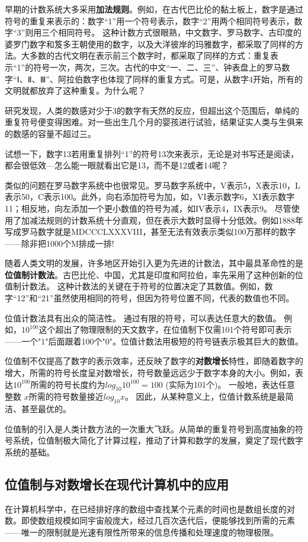 早期的计数系统大多采用{\bf 加法规则}。例如，在古代巴比伦的黏土板上，数字是通过符号的重复来表示的：数字“1”用一个符号表示，数字“2”用两个相同符号表示，数字“3”则用三个相同符号。
这种计数方式很眼熟，中文数字、罗马数字、古印度的婆罗门数字和笈多王朝使用的数字，以及大洋彼岸的玛雅数字，都采取了同样的方法。大多数的古代文明在表示前三个数字时，都采取了同样的方式：重复表示“1”的符号一次，两次，三次。古代的中文“一、二、三”、钟表盘上的罗马数字“Ⅰ、Ⅱ、Ⅲ”、阿拉伯数字也体现了同样的重复方式。可是，从数字4开始，所有的文明就都放弃了这种重复。为什么呢？

研究发现，人类的数感对少于3的数字有天然的反应，但超出这个范围后，单纯的重复符号便变得困难。对一些出生几个月的婴孩进行试验，结果证实人类与生俱来的数感的容量不超过三。

试想一下，数字13若用重复排列“1”的符号13次来表示，无论是对书写还是阅读，都会很低效---怎么能一眼就看出它是13，而不是12或者14呢？

类似的问题在罗马数字系统中也很常见。罗马数字系统中，V表示5，X表示10，L表示50，C表示100。此外，向右添加符号为加，如，VI表示数字6，XI表示数字11；相反地，向左添加一个更小数值的符号为减，如IV表示4，IX表示9。
尽管使用了加减法规则的计数系统十分直观，但在表示大数时显得十分低效。例如1888年写成罗马数字就是MDCCCLXXXVIII，甚至无法有效表示类似100万那样的数字——除非把1000个M排成一排!

随着人类文明的发展，许多地区开始引入更为先进的计数法，其中最具革命性的是{\bf 位值制计数法}。古巴比伦、中国，尤其是印度和阿拉伯，率先采用了这种创新的位值制计数法。
这种计数法的关键在于符号的位置决定了其数值。例如，数字“12”和“21”虽然使用相同的符号，但因为符号位置不同，代表的数值也不同。

位值计数法具有出众的简洁性。
通过有限的符号，可以表达任意大的数值。
例如，$10^{100}$这个超出了物理限制的天文数字，在位值制下仅需101个符号即可表示——一个"1"后面跟着100个"0"。位值计数法用极短的符号链表示极其巨大的数值。

位值制不仅提高了数字的表示效率，还反映了数字的{\bf 对数增长}特性，即随着数字的增大，所需的符号长度呈对数增长，符号数量远远少于数字本身的大小。例如，表达$10^{100}$所需的符号长度约为$log_10 10^{100}=100$ (实际为101个)。
一般地，表达任意整数 $x$所需的符号数量接近$log_{10} x$。
因此，从某种意义上，位值计数系统是最简洁、甚至最优的。

位值制的引入是人类计数方法的一次重大飞跃。从简单的重复符号到高度抽象的符号系统，位值制极大简化了计算过程，推动了计算和数学的发展，奠定了现代数字系统的基础。

\subsection{位值制与对数增长在现代计算机中的应用}
在计算机科学中，在已经排好序的数组中查找某个元素的时间也是数组长度的对数。即使数组规模如同宇宙般庞大，经过几百次迭代后，便能够找到所需的元素——唯一的限制就是光速有限性所带来的信息传播和处理速度的物理极限。

